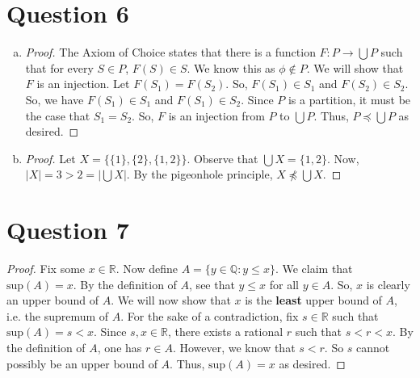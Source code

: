 \documentclass{article}
\begin{document}
\section*{Question 6}
\begin{enumerate}[(a)]
    \item \begin{proof}
        The Axiom of Choice states that there is a function $F:P\rightarrow\bigcup{P}$ such that for every $S\in{P}$, $F(S)\in{S}$. We know this as $\phi\notin{P}$. We will show that $F$ is an injection. Let $F(S_1)=F(S_2)$. So, $F(S_1)\in{S_1}$ and $F(S_2)\in{S_2}$. So, we have $F(S_1)\in{S_1}$ and $F(S_1)\in{S_2}$. Since $P$ is a partition, it must be the case that $S_1=S_2$. So, $F$ is an injection from $P$ to $\bigcup{P}$. Thus, $P\preceq\bigcup{P}$ as desired.
    \end{proof}
    \item \begin{proof}
        Let $X=\{\{1\},\{2\},\{1,2\}\}$. Observe that $\bigcup{X}=\{1,2\}$. Now, $|X|=3>2=|\bigcup{X}|$. By the pigeonhole principle, $X\npreceq\bigcup{X}$.
    \end{proof}
\end{enumerate}
\section*{Question 7}
\begin{proof}
    Fix some $x\in\mathbb{R}$. Now define $A=\{y\in\mathbb{Q}:y\leq{x}\}$. We claim that $\text{sup}(A)=x$. By the definition of $A$, see that $y\leq{x}$ for all $y\in{A}$. So, $x$ is clearly an upper bound of $A$.  We will now show that $x$ is the \textbf{least} upper bound of $A$, i.e. the supremum of $A$. For the sake of a contradiction, fix $s\in\mathbb{R}$ such that $\text{sup}(A)=s<x$. Since $s,x\in\mathbb{R}$, there exists a rational $r$ such that $s<r<x$. By the definition of $A$, one has $r\in{A}$. However, we know that $s<r$. So $s$ cannot possibly be an upper bound of $A$. Thus, $\text{sup}(A)=x$ as desired.
\end{proof}
\end{document}
